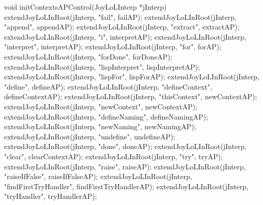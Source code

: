 \startCCode
void initContextsAPControl(JoyLoLInterp *jInterp) {
  extendJoyLoLInRoot(jInterp, "fail",                failAP);
  extendJoyLoLInRoot(jInterp, "append",              appendAP);
  extendJoyLoLInRoot(jInterp, "extract",             extractAP);
  extendJoyLoLInRoot(jInterp, "i",                   interpretAP);
  extendJoyLoLInRoot(jInterp, "interpret",           interpretAP);
  extendJoyLoLInRoot(jInterp, "for",                 forAP);
  extendJoyLoLInRoot(jInterp, "forDone",             forDoneAP);
  extendJoyLoLInRoot(jInterp, "lispInterpret",       lispInterpretAP);
  extendJoyLoLInRoot(jInterp, "lispFor",             lispForAP);
  extendJoyLoLInRoot(jInterp, "define",              defineAP);
  extendJoyLoLInRoot(jInterp, "defineContext",       defineContextAP);
  extendJoyLoLInRoot(jInterp, "thisContext",         newContextAP);
  extendJoyLoLInRoot(jInterp, "newContext",          newContextAP);
  extendJoyLoLInRoot(jInterp, "defineNaming",        defineNamingAP);
  extendJoyLoLInRoot(jInterp, "newNaming",           newNamingAP);
  extendJoyLoLInRoot(jInterp, "undefine",            undefineAP);
  extendJoyLoLInRoot(jInterp, "done",                doneAP);
  extendJoyLoLInRoot(jInterp, "clear",               clearContextAP);
  extendJoyLoLInRoot(jInterp, "try",                 tryAP);
  extendJoyLoLInRoot(jInterp, "raise",               raiseAP);
  extendJoyLoLInRoot(jInterp, "raiseIfFalse",        raiseIfFalseAP);
  extendJoyLoLInRoot(jInterp, "findFirstTryHandler", findFirstTryHandlerAP);
  extendJoyLoLInRoot(jInterp, "tryHandler",          tryHandlerAP);
}
\stopCCode